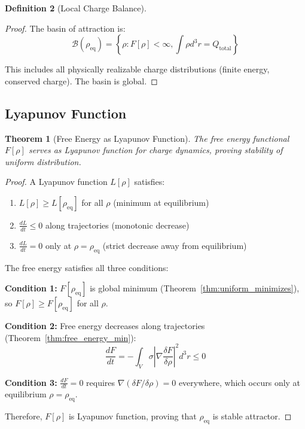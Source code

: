 \documentclass[12pt,a4paper]{article}
\theoremstyle{plain}
\newtheorem{theorem}{Theorem}[section]
\theoremstyle{definition}
\newtheorem{definition}[theorem]{Definition}
\theoremstyle{remark}
\begin{document}
\begin{definition}[Local Charge Balance]
\begin{proof}
The basin of attraction is:
\begin{equation}
\mathcal{B}(\rho_{\text{eq}}) = \left\{ \rho : F[\rho] < \infty, \int \rho d^3r = Q_{\text{total}} \right\}
\end{equation}

This includes all physically realizable charge distributions (finite energy, conserved charge). The basin is global.
\end{proof}

\subsection{Lyapunov Function}

\begin{theorem}[Free Energy as Lyapunov Function]
\label{thm:lyapunov}
The free energy functional $F[\rho]$ serves as Lyapunov function for charge dynamics, proving stability of uniform distribution.
\end{theorem}

\begin{proof}
A Lyapunov function $L[\rho]$ satisfies:
\begin{enumerate}
\item $L[\rho] \geq L[\rho_{\text{eq}}]$ for all $\rho$ (minimum at equilibrium)
\item $\frac{dL}{dt} \leq 0$ along trajectories (monotonic decrease)
\item $\frac{dL}{dt} = 0$ only at $\rho = \rho_{\text{eq}}$ (strict decrease away from equilibrium)
\end{enumerate}

The free energy satisfies all three conditions:

\textbf{Condition 1:} $F[\rho_{\text{eq}}]$ is global minimum (Theorem~\ref{thm:uniform_minimizes}), so $F[\rho] \geq F[\rho_{\text{eq}}]$ for all $\rho$.

\textbf{Condition 2:} Free energy decreases along trajectories (Theorem~\ref{thm:free_energy_min}):
\begin{equation}
\frac{dF}{dt} = -\int_V \sigma \left| \nabla \frac{\delta F}{\delta \rho} \right|^2 d^3r \leq 0
\end{equation}

\textbf{Condition 3:} $\frac{dF}{dt} = 0$ requires $\nabla (\delta F / \delta \rho) = 0$ everywhere, which occurs only at equilibrium $\rho = \rho_{\text{eq}}$.

Therefore, $F[\rho]$ is Lyapunov function, proving that $\rho_{\text{eq}}$ is stable attractor.
\end{proof}


\end{definition}
\end{document}
